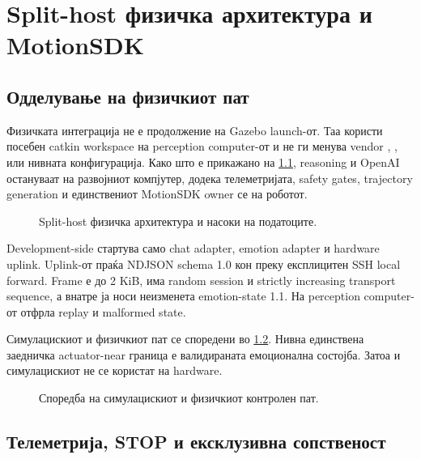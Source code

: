 \chapter{Split-host физичка архитектура и MotionSDK}
\label{chap:hardware}

\section{Одделување на физичкиот пат}

Физичката интеграција не е продолжение на Gazebo launch-от. Таа користи
посебен catkin workspace на perception computer-от и не ги менува vendor
, ,  или нивната конфигурација.
Како што е прикажано на \cref{fig:split-host}, reasoning и OpenAI остануваат на
развојниот компјутер, додека телеметријата, safety gates, trajectory generation
и единствениот MotionSDK owner се на роботот.

\begin{figure}[htbp]
\centering
\resizebox{\textwidth}{!}{}
\caption{Split-host физичка архитектура и насоки на податоците.}
\label{fig:split-host}
\end{figure}

Development-side  стартува само chat adapter,
emotion adapter и hardware uplink. Uplink-от праќа NDJSON schema 1.0 кон
 преку експлицитен SSH local forward. Frame е до 2 KiB,
има random session и strictly increasing transport sequence, а внатре ја носи
неизменета emotion-state 1.1. На perception computer-от
 отфрла replay и malformed state.

Симулацискиот и физичкиот пат се споредени во \cref{fig:path-comparison}.
Нивна единствена заедничка actuator-near граница е валидираната емоционална
состојба. Затоа  и симулацискиот
 не се користат на hardware.

\begin{figure}[htbp]
\centering
\resizebox{\textwidth}{!}{}
\caption{Споредба на симулацискиот и физичкиот контролен пат.}
\label{fig:path-comparison}
\end{figure}

\section{Телеметрија, STOP и ексклузивна сопственост}


